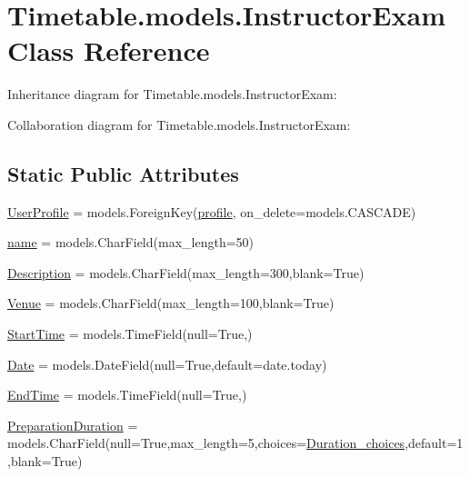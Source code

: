\hypertarget{classTimetable_1_1models_1_1InstructorExam}{}\section{Timetable.\+models.\+Instructor\+Exam Class Reference}
\label{classTimetable_1_1models_1_1InstructorExam}


Inheritance diagram for Timetable.\+models.\+Instructor\+Exam\+:


Collaboration diagram for Timetable.\+models.\+Instructor\+Exam\+:
\subsection*{Static Public Attributes}
\begin{DoxyCompactItemize}
\item 
\hyperlink{classTimetable_1_1models_1_1InstructorExam_af326282d965bce96fab4299110f263ed}{User\+Profile} = models.\+Foreign\+Key(\hyperlink{classprofiles_1_1models_1_1profile}{profile}, on\+\_\+delete=models.\+C\+A\+S\+C\+A\+DE)
\item 
\hyperlink{classTimetable_1_1models_1_1InstructorExam_a48cd7517f1628975472ef83904920218}{name} = models.\+Char\+Field(max\+\_\+length=50)
\item 
\hyperlink{classTimetable_1_1models_1_1InstructorExam_abdc61f9997ac6bdf57c5a7890a511525}{Description} = models.\+Char\+Field(max\+\_\+length=300,blank=True)
\item 
\hyperlink{classTimetable_1_1models_1_1InstructorExam_a9f5ce43673952abe53e402c9caefb1ec}{Venue} = models.\+Char\+Field(max\+\_\+length=100,blank=True)
\item 
\hyperlink{classTimetable_1_1models_1_1InstructorExam_a06e43e83ab42cca5a7ae69a2d76e1a48}{Start\+Time} = models.\+Time\+Field(null=True,)
\item 
\hyperlink{classTimetable_1_1models_1_1InstructorExam_a632313b267299b3374bf86838b81f4ce}{Date} = models.\+Date\+Field(null=True,default=date.\+today)
\item 
\hyperlink{classTimetable_1_1models_1_1InstructorExam_af33204911bbaebe1b4df4d4dd7170c98}{End\+Time} = models.\+Time\+Field(null=True,)
\item 
\hyperlink{classTimetable_1_1models_1_1InstructorExam_aa762dcd26595ad1bf6cc7e361b6940d0}{Preparation\+Duration} = models.\+Char\+Field(null=True,max\+\_\+length=5,choices=\hyperlink{namespaceTimetable_1_1models_a3de5e5d97c7dbbfd08e212b9d1ad3ec5}{Duration\+\_\+choices},default=\textquotesingle{}1\textquotesingle{},blank=True)
\end{DoxyCompactItemize}



